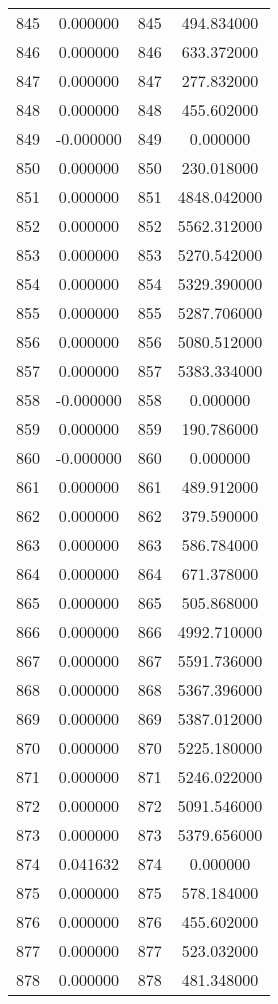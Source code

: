 \documentclass[12pt]{article}
\begin{document}
\begin{longtable}{@{}cccc@{}}
845 & 0.000000 & 845 & 494.834000 \\
846 & 0.000000 & 846 & 633.372000 \\
847 & 0.000000 & 847 & 277.832000 \\
848 & 0.000000 & 848 & 455.602000 \\
849 & -0.000000 & 849 & 0.000000 \\
850 & 0.000000 & 850 & 230.018000 \\
851 & 0.000000 & 851 & 4848.042000 \\
852 & 0.000000 & 852 & 5562.312000 \\
853 & 0.000000 & 853 & 5270.542000 \\
854 & 0.000000 & 854 & 5329.390000 \\
855 & 0.000000 & 855 & 5287.706000 \\
856 & 0.000000 & 856 & 5080.512000 \\
857 & 0.000000 & 857 & 5383.334000 \\
858 & -0.000000 & 858 & 0.000000 \\
859 & 0.000000 & 859 & 190.786000 \\
860 & -0.000000 & 860 & 0.000000 \\
861 & 0.000000 & 861 & 489.912000 \\
862 & 0.000000 & 862 & 379.590000 \\
863 & 0.000000 & 863 & 586.784000 \\
864 & 0.000000 & 864 & 671.378000 \\
865 & 0.000000 & 865 & 505.868000 \\
866 & 0.000000 & 866 & 4992.710000 \\
867 & 0.000000 & 867 & 5591.736000 \\
868 & 0.000000 & 868 & 5367.396000 \\
869 & 0.000000 & 869 & 5387.012000 \\
870 & 0.000000 & 870 & 5225.180000 \\
871 & 0.000000 & 871 & 5246.022000 \\
872 & 0.000000 & 872 & 5091.546000 \\
873 & 0.000000 & 873 & 5379.656000 \\
874 & 0.041632 & 874 & 0.000000 \\
875 & 0.000000 & 875 & 578.184000 \\
876 & 0.000000 & 876 & 455.602000 \\
877 & 0.000000 & 877 & 523.032000 \\
878 & 0.000000 & 878 & 481.348000 \\

\end{longtable}
\end{document}
